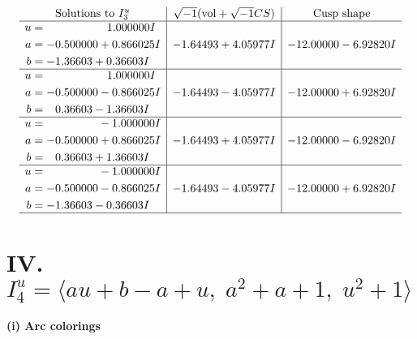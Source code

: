 \documentclass[1p]{elsarticle_modified}
\theoremstyle{definition}
\newcommand{\I}{\sqrt{-1}}
\begin{document}
$$\begin{array}{c|c|c}  
\text{Solutions to }I^u_{3}& \I (\text{vol} + \sqrt{-1}CS) & \text{Cusp shape}\\
 \hline 
\begin{aligned}
u &= \phantom{-0.000000 -}1.000000 I \\
a &= -0.500000 + 0.866025 I \\
b &= -1.36603 + 0.36603 I\end{aligned}
 & -1.64493 + 4.05977 I & -12.00000 - 6.92820 I \\ \hline\begin{aligned}
u &= \phantom{-0.000000 -}1.000000 I \\
a &= -0.500000 - 0.866025 I \\
b &= \phantom{-}0.36603 - 1.36603 I\end{aligned}
 & -1.64493 - 4.05977 I & -12.00000 + 6.92820 I \\ \hline\begin{aligned}
u &= \phantom{-0.000000 } -1.000000 I \\
a &= -0.500000 + 0.866025 I \\
b &= \phantom{-}0.36603 + 1.36603 I\end{aligned}
 & -1.64493 + 4.05977 I & -12.00000 - 6.92820 I \\ \hline\begin{aligned}
u &= \phantom{-0.000000 } -1.000000 I \\
a &= -0.500000 - 0.866025 I \\
b &= -1.36603 - 0.36603 I\end{aligned}
 & -1.64493 - 4.05977 I & -12.00000 + 6.92820 I\\
 \hline 
 \end{array}$$\newpage\newpage\renewcommand{\arraystretch}{1}
\centering \section*{IV. $I^u_{4}= \langle a u+b- a+u,\;a^2+a+1,\;u^2+1 \rangle$}
\flushleft \textbf{(i) Arc colorings}\\
\end{document}
